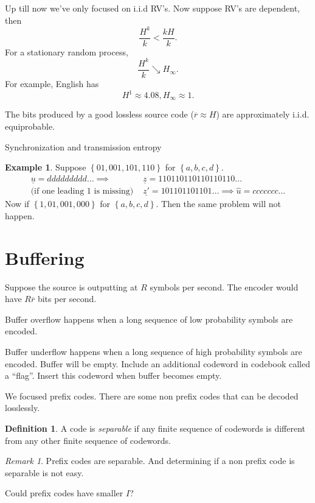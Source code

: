 \documentclass{report}
\newcommand{\set}[1]{\left\lbrace #1 \right\rbrace}
\theoremstyle{definition}
\newtheorem{definition}{Definition}[section]
\newtheorem{example}{Example}[section]
\theoremstyle{remark}
\newtheorem*{remark}{Remark}
\numberwithin{equation}{section}
\begin{document}
Up till now we've only focused on i.i.d RV's. Now suppose RV's are dependent, then \[\frac{H^k}{k} < \frac{kH}{k}.\]
For a stationary random process, \[
  \frac{H^k}{k} \searrow H_\infty.  
\] For example, English has \[
  H^1 \approx 4.08, H_\infty \approx 1.  
\]

The bits produced by a good lossless source code ($\overline{r} \approx H$) are approximately i.i.d. equiprobable.

Synchronization and transmission entropy

\begin{example}\label{ex:onebitmess}
  Suppose $\set{01, 001, 101, 110}$ for $\set{a, b, c, d}$. 
  \begin{align*}
    \underline{u} = ddddddddd\ldots \implies & \underline{z}= 110110110110110110\ldots \\
    \text{(if one leading $1$ is missing) } & \underline{z'} =101101101101\ldots \implies \hat{u} = ccccccc\ldots
  \end{align*}
  Now if $\set{1, 01, 001, 000}$ for $\set{a, b, c, d}$. Then the same problem will not happen.
\end{example}

\section{Buffering}
Suppose the source is outputting at $R$ symbols per second. The encoder would have $R\overline{r}$ bits per second.

Buffer overflow happens when a long sequence of low probability symbols are encoded.

Buffer underflow happens when a long sequence of high probability symbols are encoded. Buffer will be empty. Include an additional codeword in codebook called a ``flag''. Insert this codeword when buffer becomes empty.

We focused prefix codes. There are some non prefix codes that can be decoded losslessly.

\begin{definition}
  A code is \emph{separable} if any finite sequence of codewords is different from any other finite sequence of codewords.
\end{definition}

\begin{remark}
  Prefix codes are separable. And determining if a non prefix code is separable is not easy.
\end{remark}
Could prefix codes have smaller $I$?
\end{document}
